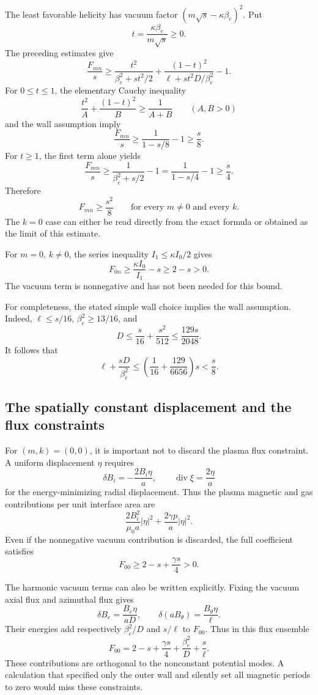 The least favorable helicity has vacuum factor
$(m\sqrt{s}-\kappa\beta_e)^2$.  Put
\[
 t=\frac{\kappa\beta_e}{m\sqrt{s}}\ge0.
\]
The preceding estimates give
\[
 \frac{F_{mn}}{s}\ge
 \frac{t^2}{\beta_e^2+st^2/2}
 +\frac{(1-t)^2}{\ell+st^2D/\beta_e^2}-1.
\]
For $0\le t\le1$, the elementary Cauchy inequality
\[
 \frac{t^2}{A}+\frac{(1-t)^2}{B}\ge\frac{1}{A+B}
 \qquad (A,B>0)
\]
and the wall assumption imply
\[
 \frac{F_{mn}}{s}\ge
 \frac{1}{1-s/8}-1\ge\frac{s}{8}.
\]
For $t\ge1$, the first term alone yields
\[
 \frac{F_{mn}}{s}\ge
 \frac{1}{\beta_e^2+s/2}-1
 =\frac{1}{1-s/4}-1\ge\frac{s}{4}.
\]
Therefore
\[
 F_{mn}\ge\frac{s^2}{8}
 \qquad\text{for every }m\ne0\text{ and every }k.
\]
The $k=0$ case can either be read directly from the exact formula or
obtained as the limit of this estimate.

For $m=0$, $k\ne0$, the series inequality $I_1\le\kappa I_0/2$ gives
\[
 F_{0n}\ge\frac{\kappa I_0}{I_1}-s\ge2-s>0.
\]
The vacuum term is nonnegative and has not been needed for this bound.

For completeness, the stated simple wall choice implies the wall
assumption.  Indeed, $\ell\le s/16$, $\beta_e^2\ge13/16$, and
\[
 D\le\frac{s}{16}+\frac{s^2}{512}
     \le\frac{129s}{2048}.
\]
It follows that
\[
 \ell+\frac{sD}{\beta_e^2}
 \le\left(\frac1{16}+\frac{129}{6656}\right)s
 <\frac{s}{8}.
\]

\subsection{The spatially constant displacement and the flux constraints}

For $(m,k)=(0,0)$, it is important not to discard the plasma flux
constraint.  A uniform displacement $\eta$ requires
\[
 \delta B_i=-\frac{2B_i\eta}{a},
 \qquad \operatorname{div}\xi=\frac{2\eta}{a}
\]
for the energy-minimizing radial displacement.  Thus the plasma
magnetic and gas contributions per unit interface area are
\[
 \frac{2B_i^2}{\mu_0a}|\eta|^2
       +\frac{2\gamma p}{a}|\eta|^2.
\]
Even if the nonnegative vacuum contribution is discarded, the full
coefficient satisfies
\[
 F_{00}\ge2-s+\frac{\gamma s}{4}>0.
\]

The harmonic vacuum terms can also be written explicitly.  Fixing the
vacuum axial flux and azimuthal flux gives
\[
 \delta B_e=\frac{B_e\eta}{aD},
 \qquad
 \delta(aB_\theta)=\frac{B_\theta\eta}{\ell}.
\]
Their energies add respectively $\beta_e^2/D$ and $s/\ell$ to
$F_{00}$.  Thus in this flux ensemble
\[
 F_{00}=2-s+\frac{\gamma s}{4}
                +\frac{\beta_e^2}{D}+\frac{s}{\ell}.
\]
These contributions are orthogonal to the nonconstant potential
modes.  A calculation that specified only the outer wall and silently
set all magnetic periods to zero would miss these constraints.

